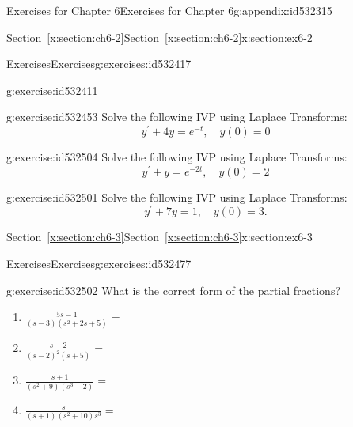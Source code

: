 \documentclass[oneside,10pt,]{book}
\newcommand{\xreffont}{\relax}
\numberwithin{equation}{section}
\numberwithin{equation}{section}
\begin{document}
\begin{appendixptx}{Exercises for Chapter 6}{}{Exercises for Chapter 6}{}{}{g:appendix:id532315}
\begin{sectionptx}{Section~{\xreffont\ref*{x:section:ch6-2}}}{}{Section~{\xreffont\ref*{x:section:ch6-2}}}{}{}{x:section:ex6-2}
\begin{exercises-subsection-numberless}{Exercises}{}{Exercises}{}{}{g:exercises:id532417}
\begin{divisionexercise}{1}{}{}{g:exercise:id532411}
\begin{enumerate}[label=(\alph*)]
\end{enumerate}
\end{divisionexercise}%
\begin{divisionexercise}{2}{}{}{g:exercise:id532453}%
Solve the following IVP using Laplace Transforms:%
\begin{equation*}
y^{\prime}+4y=e^{-t},\,\,\,\,\,\,y(0)=0
\end{equation*}
%
\end{divisionexercise}%
\begin{divisionexercise}{3}{}{}{g:exercise:id532504}%
Solve the following IVP using Laplace Transforms:%
\begin{equation*}
y^{\prime}+y=e^{-2t},\,\,\,\,\,\,y(0)=2
\end{equation*}
%
\end{divisionexercise}%
\begin{divisionexercise}{4}{}{}{g:exercise:id532501}%
Solve the following IVP using Laplace Transforms:%
\begin{equation*}
y^{\prime}+7y=1,\,\,\,\,\,\,y(0)=3.
\end{equation*}
%
\end{divisionexercise}%
\end{exercises-subsection-numberless}
\end{sectionptx}
%
%
\typeout{************************************************}
\typeout{Section G.3 Section~{\xreffont\ref*{x:section:ch6-3}}}
\typeout{************************************************}
%
\begin{sectionptx}{Section~{\xreffont\ref*{x:section:ch6-3}}}{}{Section~{\xreffont\ref*{x:section:ch6-3}}}{}{}{x:section:ex6-3}
%
%
\typeout{************************************************}
\typeout{************************************************}
%
\begin{exercises-subsection-numberless}{Exercises}{}{Exercises}{}{}{g:exercises:id532477}
\begin{divisionexercise}{1}{}{}{g:exercise:id532502}%
What is the correct form of the partial fractions?%
\begin{enumerate}[label=(\alph*)]
\item{}\(\displaystyle \frac{5s-1}{\left(s-3\right)\left(s^{2}+2s+5\right)}=\)%
\item{}\(\displaystyle \frac{s-2}{\left(s-2\right)^{2}\left(s+5\right)}=\)%
\item{}\(\displaystyle \frac{s+1}{\left(s^{2}+9\right)\left(s^{3}+2\right)}=\)%
\item{}\(\displaystyle \frac{s}{\left(s+1\right)\left(s^{2}+10\right)s^{3}}=\)%

\end{enumerate}
\end{divisionexercise}
\end{exercises-subsection-numberless}
\end{sectionptx}
\end{appendixptx}
\end{document}
